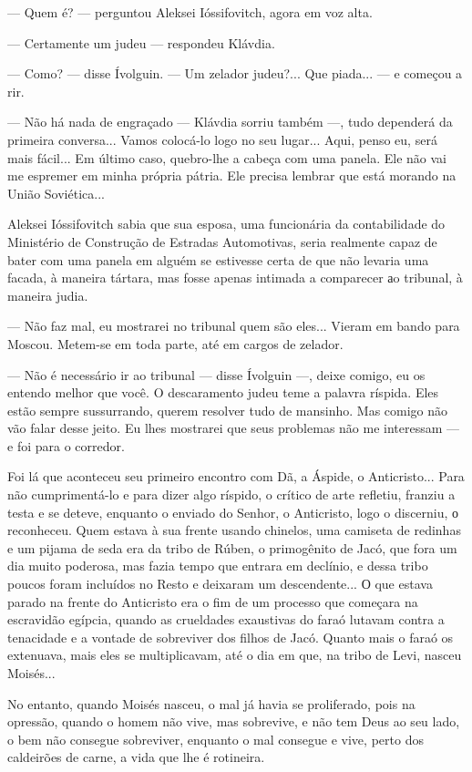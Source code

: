 --- Quem é? --- perguntou Aleksei Ióssifovitch, agora em voz alta.

--- Certamente um judeu --- respondeu Klávdia.

--- Como? --- disse Ívolguin. --- Um zelador judeu?... Que piada... ---
e começou a rir.

--- Não há nada de engraçado --- Klávdia sorriu também ---, tudo
dependerá da primeira conversa... Vamos colocá-lo logo no seu lugar...
Aqui, penso eu, será mais fácil... Em último caso, quebro-lhe a cabeça
com uma panela. Ele não vai me espremer em minha própria pátria. Ele
precisa lembrar que está morando na União Soviética...

Aleksei Ióssifovitch sabia que sua esposa, uma funcionária da
contabilidade do Ministério de Construção de Estradas Automotivas, seria
realmente capaz de bater com uma panela em alguém se estivesse certa de
que não levaria uma facada, à maneira tártara, mas fosse apenas intimada
a comparecer аo tribunal, à maneira judia.

--- Não faz mal, eu mostrarei no tribunal quem são eles... Vieram em
bando para Moscou. Metem-se em toda parte, até em cargos de zelador.

--- Não é necessário ir ao tribunal --- disse Ívolguin ---, deixe
comigo, eu os entendo melhor que você. O descaramento judeu teme a
palavra ríspida. Eles estão sempre sussurrando, querem resolver tudo de
mansinho. Mas comigo não vão falar desse jeito. Eu lhes mostrarei que
seus problemas não me interessam --- e foi para o corredor.

Foi lá que aconteceu seu primeiro encontro com Dã, a Áspide, o
Anticristo... Para não cumprimentá-lo e para dizer algo ríspido, o
crítico de arte refletiu, franziu a testa e se deteve, enquanto o
enviado do Senhor, o Anticristo, logo o discerniu, о reconheceu. Quem
estava à sua frente usando chinelos, uma camiseta de redinhas e um
pijama de seda era da tribo de Rúben, o primogênito de Jacó, que fora um
dia muito poderosa, mas fazia tempo que entrara em declínio, e dessa
tribo poucos foram incluídos no Resto e deixaram um descendente... О que
estava parado na frente do Anticristo era o fim de um processo que
começara na escravidão egípcia, quando as crueldades exaustivas do faraó
lutavam contra a tenacidade e a vontade de sobreviver dos filhos de
Jacó. Quanto mais o faraó os extenuava, mais eles se multiplicavam, até
o dia em que, na tribo de Levi, nasceu Moisés...

No entanto, quando Moisés nasceu, o mal já havia se proliferado, pois na
opressão, quando o homem não vive, mas sobrevive, e não tem Deus ao seu
lado, o bem não consegue sobreviver, enquanto o mal consegue e vive,
perto dos caldeirões de carne, a vida que lhe é rotineira.

